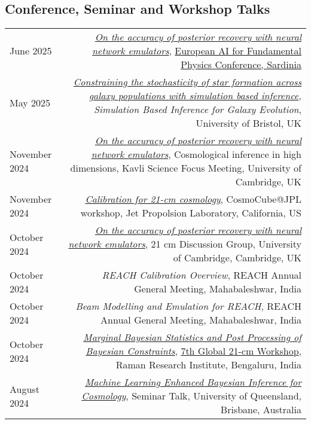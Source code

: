 \documentclass{article}
\begin{document}
\subsection*{Conference, Seminar and Workshop Talks}
\begin{tabular}{L!{\vrule}R}
    June 2025 & \textit{\href{}{On the accuracy of posterior recovery with neural network emulators}}, \href{https://agenda.infn.it/event/43565/}{European AI for Fundamental Physics Conference, Sardinia} \\
    May 2025 & \textit{\href{}{Constraining the stochasticity of star formation across galaxy populations with simulation based inference}, Simulation Based Inference for Galaxy Evolution}, University of Bristol, UK \\
    November 2024 & \textit{\href{https://github.com/htjb/Talks/raw/master/Talks/Kavli-high-dimensional-analysis-20NOV24/posterior-validation.pdf}{On the accuracy of posterior recovery with neural network emulators}}, Cosmological inference in high dimensions, Kavli Science Focus Meeting, University of Cambridge, UK \\
    November 2024 & \textit{\href{https://github.com/htjb/Talks/raw/master/Talks/CosmoCube-JPL-Workshop-2024/calibration-jpl-cosmocube.pdf}{Calibration for 21-cm cosmology}}, CosmoCube@JPL workshop, Jet Propolsion Laboratory, California, US \\
    October 2024 & \textit{\href{https://github.com/htjb/Talks/raw/master/Talks/21cm-Meeting-14OCT24/posterior-validation.pdf}{On the accuracy of posterior recovery with neural network emulators}}, 21 cm Discussion Group, University of Cambridge, Cambridge, UK \\
    October 2024 & \textit{REACH Calibration Overview}, REACH Annual General Meeting, Mahabaleshwar, India \\
    October 2024 & \textit{Beam Modelling and Emulation for REACH}, REACH Annual General Meeting, Mahabaleshwar, India \\
    October 2024 & \textit{\href{https://github.com/htjb/Talks/raw/master/Talks/7th-Global-Workshop/margarine.pdf}{Marginal Bayesian Statistics and Post Processing of Bayesian Constraints}}, \href{https://sites.google.com/view/global-21-cm-workshop}{7th Global 21-cm Workshop}, Raman Research Institute, Bengaluru, India \\
    August 2024 & \textit{\href{https://github.com/htjb/Talks/tree/master/Talks/brisbane_davis_group_meeting_2024}{Machine Learning Enhanced Bayesian Inference for Cosmology}}, Seminar Talk, University of Queensland, Brisbane, Australia \\

\end{tabular}
\end{document}
